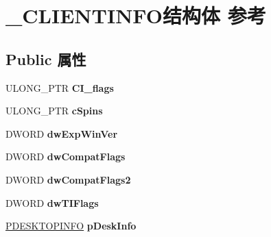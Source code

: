 \hypertarget{struct___c_l_i_e_n_t_i_n_f_o}{}\section{\+\_\+\+C\+L\+I\+E\+N\+T\+I\+N\+F\+O结构体 参考}
\label{struct___c_l_i_e_n_t_i_n_f_o}
\subsection*{Public 属性}
\begin{DoxyCompactItemize}
\item 
\mbox{\label{struct___c_l_i_e_n_t_i_n_f_o_a6a34a7af46a25588697e277422888b56}} 
U\+L\+O\+N\+G\+\_\+\+P\+TR {\bfseries C\+I\+\_\+flags}
\item 
\mbox{\label{struct___c_l_i_e_n_t_i_n_f_o_a36909e556283430185d68fe259533355}} 
U\+L\+O\+N\+G\+\_\+\+P\+TR {\bfseries c\+Spins}
\item 
\mbox{\label{struct___c_l_i_e_n_t_i_n_f_o_a64b160ede9250dce69910d633351ff28}} 
D\+W\+O\+RD {\bfseries dw\+Exp\+Win\+Ver}
\item 
\mbox{\label{struct___c_l_i_e_n_t_i_n_f_o_ab59454becf9b2fe634dfaf079b09116c}} 
D\+W\+O\+RD {\bfseries dw\+Compat\+Flags}
\item 
\mbox{\label{struct___c_l_i_e_n_t_i_n_f_o_a7d6f41679c380967a5e56096dcbfa870}} 
D\+W\+O\+RD {\bfseries dw\+Compat\+Flags2}
\item 
\mbox{\label{struct___c_l_i_e_n_t_i_n_f_o_a5f5aea8f9dcc87e857cbbb6cc9e996b1}} 
D\+W\+O\+RD {\bfseries dw\+T\+I\+Flags}
\item 
\mbox{\label{struct___c_l_i_e_n_t_i_n_f_o_a71c74e0fa64e56318a27c5f7f5f6b8bd}} 
\hyperlink{struct___d_e_s_k_t_o_p_i_n_f_o}{P\+D\+E\+S\+K\+T\+O\+P\+I\+N\+FO} {\bfseries p\+Desk\+Info}
\item 
\mbox{\label{struct___c_l_i_e_n_t_i_n_f_o_a32784b79fadae995a4633c9c1776f69b}} 

\end{DoxyCompactItemize}
